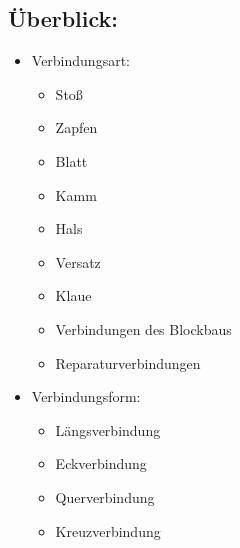 \documentclass[fleqn,twoside]{article}
\begin{document}
    \subsection{Überblick:}
    \begin{minipage}{0.45\textwidth}
        \begin{itemize}
            \item Verbindungsart:
                \begin{itemize}
                    \item Stoß
                    \item Zapfen
                    \item Blatt
                    \item Kamm
                    \item Hals
                    \item Versatz
                    \item Klaue
                    \item Verbindungen des Blockbaus
                    \item Reparaturverbindungen
                \end{itemize}
            \end{itemize}
    \end{minipage}
    \begin{minipage}{0.45\textwidth}
        \begin{itemize}
                \item Verbindungsform:
                \begin{itemize}
                    \item Längsverbindung
                    \item Eckverbindung
                    \item Querverbindung
                    \item Kreuzverbindung
                \end{itemize}
        \end{itemize}
    \end{minipage}
        
    
    
\end{document}
